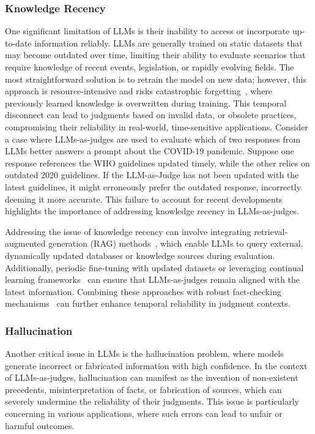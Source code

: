 \subsubsection{Knowledge Recency}
\label{sec:Knowledge Recency}
One significant limitation of LLMs is their inability to access or incorporate up-to-date information reliably. LLMs are generally trained on static datasets that may become outdated over time, limiting their ability to evaluate scenarios that require knowledge of recent events, legislation, or rapidly evolving fields. The most straightforward solution is to retrain the model on new data; however, this approach is resource-intensive and risks catastrophic forgetting~\cite{luo2023empirical}, where previously learned knowledge is overwritten during training.
This temporal disconnect can lead to judgments based on invalid data, or obsolete practices, compromising their reliability in real-world, time-sensitive applications. Consider a case where LLMs-as-judges are used to evaluate which of two responses from LLMs better answers a prompt about the COVID-19 pandemic. Suppose one response references the WHO guidelines updated timely, while the other relies on outdated 2020 guidelines. If the LLM-as-Judge has not been updated with the latest guidelines, it might erroneously prefer the outdated response, incorrectly deeming it more accurate. This failure to account for recent developments highlights the importance of addressing knowledge recency in LLMs-as-judges.



Addressing the issue of knowledge recency can involve integrating retrieval-augmented generation (RAG) methods~\cite{gao2023retrieval,lewis2020retrieval}, which enable LLMs to query external, dynamically updated databases or knowledge sources during evaluation. 
Additionally, periodic fine-tuning with updated datasets or leveraging continual learning frameworks~\cite{wu2024continual} can ensure that LLMs-as-judges remain aligned with the latest information. Combining these approaches with robust fact-checking mechanisms~\cite{dierickx2024striking} can further enhance temporal reliability in judgment contexts.




\subsubsection{Hallucination}
\label{sec:Hallucination}
Another critical issue in LLMs is the hallucination problem, where models generate incorrect or fabricated information with high confidence. In the context of LLMs-as-judges, hallucination can manifest as the invention of non-existent precedents, misinterpretation of facts, or fabrication of sources, which can severely undermine the reliability of their judgments. This issue is particularly concerning in various applications, where such errors can lead to unfair or harmful outcomes.

